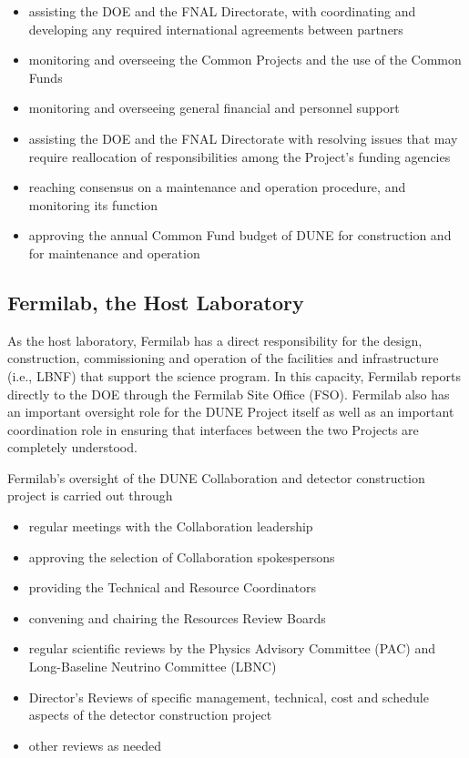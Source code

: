 \begin{itemize}
\item assisting the DOE and the FNAL Directorate,
with coordinating and developing any required international
agreements between partners
\item monitoring and overseeing the Common Projects and the
use of the Common Funds 
\item monitoring and overseeing general financial and personnel support
\item assisting the DOE and the FNAL Directorate
with resolving issues that may require reallocation of responsibilities
among the Project's funding agencies
\item reaching consensus on a maintenance and operation procedure,
and monitoring its function
\item  approving the annual Common Fund 
budget of DUNE for construction and for maintenance and operation 
\end{itemize}

\subsection{Fermilab, the Host Laboratory}

As the host laboratory, Fermilab has a direct responsibility for the design,
construction, commissioning and operation of the facilities and
infrastructure (i.e., LBNF) that support the science program. 
In this capacity, Fermilab reports
directly to the DOE through the Fermilab Site Office (FSO).
Fermilab also has an important oversight role for the DUNE Project
itself as well as an important coordination role in ensuring that
interfaces between the two Projects are completely understood. 

Fermilab's oversight of the DUNE Collaboration and detector
construction project is carried out through
\begin{itemize}
\item regular meetings with the Collaboration leadership
\item approving the selection of Collaboration spokespersons
\item  providing the Technical and Resource Coordinators
\item  convening and chairing the Resources Review Boards
\item  regular scientific reviews by the Physics Advisory Committee (PAC) and Long-Baseline Neutrino Committee (LBNC)
\item  Director's Reviews of specific management, technical,
cost and schedule aspects of the detector construction project
\item other reviews as needed
\end{itemize}

